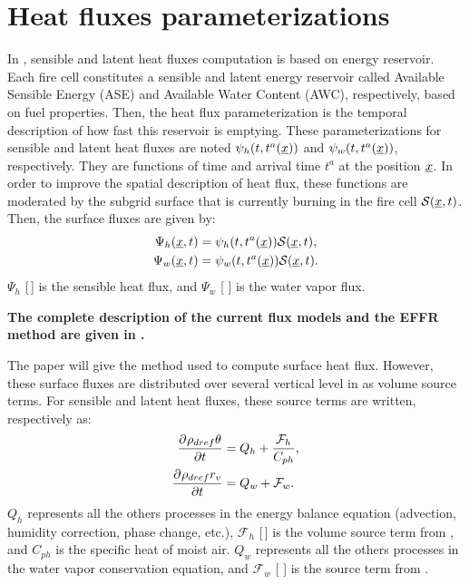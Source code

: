 \section{Heat fluxes parameterizations}

In \Blaze, sensible and latent heat fluxes computation is based on energy reservoir. Each fire cell constitutes a sensible and latent energy reservoir called Available Sensible Energy (ASE) and Available Water Content (AWC), respectively, based on fuel properties. Then, the heat flux parameterization is the temporal description of how fast this reservoir is emptying. These parameterizations for sensible and latent heat fluxes are noted $\psi_h(t, t^a(\underline{x}))$ and $\psi_w(t, t^a(\underline{x}))$, respectively. They are functions of time and arrival time $t^a$ at the position $\underline{x}$.
In order to improve the spatial description of heat flux, these functions are moderated by the subgrid surface that is currently burning in the fire cell $\mathcal S (\underline{x}, t)$. 
Then, the surface fluxes are given by:
\begin{align}
	\Psi_h (\underline{x}, t) &= \psi_h(t, t^a(\underline{x})) \mathcal S (\underline{x}, t), \\
	\Psi_w (\underline{x}, t) &= \psi_w(t, t^a(\underline{x})) \mathcal S (\underline{x}, t).
\end{align}
$\Psi_h$ [\watt\,\rpsquare\meter] is the sensible heat flux, and $\Psi_w$ [\kilo\gram\,\reciprocal\second\,\rpsquare\meter] is the water vapor flux. 

\textbf{The complete description of the current flux models and the EFFR method are given in \citep{costes2021subgrid}.}

The paper will give the method used to compute surface heat flux. However, these surface fluxes are distributed over several vertical level in \MNH{} as volume source terms. For sensible and latent heat fluxes, these source terms are written, respectively as:
\begin{align}
	\frac{\partial^{} \rho_{dref} \theta}{\partial t} &= Q_h + \frac{\mathcal F_h}{C_{ph}}, \\
	\frac{\partial^{} \rho_{dref} r_v}{\partial t} &= Q_w + \mathcal F_w.
\end{align} 
$Q_h$ represents all the others processes in the \MNH{} energy balance equation (advection, humidity correction, phase change, etc.), $\mathcal F_h$ [\watt\,\rpcubic\meter] is the volume source term from \Blaze, and $C_{ph}$ is the specific heat of moist air. 
$Q_w$ represents all the others processes in the \MNH{} water vapor conservation equation, and $\mathcal F_w$ [\kilo\gram\,\reciprocal\second\,\rpcubic\meter] is the source term from \Blaze.

